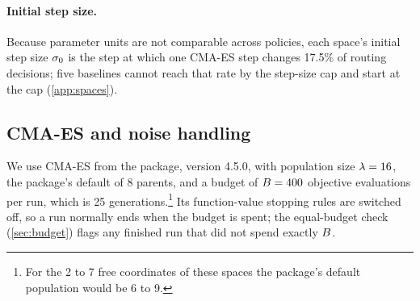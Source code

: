 \paragraph{Initial step size.}
Because parameter units are not comparable across policies, each space's initial step size
$\sigma_{0}$ is the step at which one CMA-ES step changes 17.5\% of routing decisions; five
baselines cannot reach that rate by the step-size cap and start at the cap (\cref{app:spaces}).

\subsection{CMA-ES and noise handling}
\label{sec:noise}

We use CMA-ES \citep{hansen2016tutorial} from the  package, version 4.5.0, with
population size $\lambda = 16$, the package's default of 8 parents, and a budget of
$B = 400$ objective evaluations per run, which is 25 generations.\footnote{For the 2 to 7
  free coordinates of these spaces the package's default population would be 6 to 9.} Its
function-value stopping rules are switched off, so a run normally ends when the budget is spent;
the equal-budget check (\cref{sec:budget}) flags any finished run that did not spend exactly
$B$.

